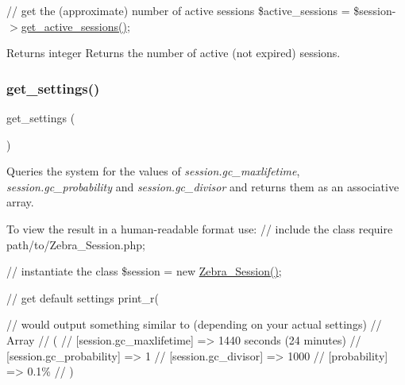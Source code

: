 {\ttfamily // get the (approximate) number of active sessions \$active\+\_\+sessions = \$session-\/$>$\mbox{\hyperlink{class_zebra___session_a7d6d31df5f4285519ff1efbc783c36a7}{get\+\_\+active\+\_\+sessions()}}; }

\begin{DoxyReturn}{Returns}
integer Returns the number of active (not expired) sessions. 
\end{DoxyReturn}
\mbox{\label{class_zebra___session_abcfd9631c087a2aa25d472ad9b450c4f}} 
\subsubsection{\texorpdfstring{get\+\_\+settings()}{get\_settings()}}
{\footnotesize\ttfamily get\+\_\+settings (\begin{DoxyParamCaption}{ }\end{DoxyParamCaption})}

Queries the system for the values of {\itshape session.\+gc\+\_\+maxlifetime}, {\itshape session.\+gc\+\_\+probability} and {\itshape session.\+gc\+\_\+divisor} and returns them as an associative array.

To view the result in a human-\/readable format use\+: {\ttfamily  // include the class require \textquotesingle{}path/to/\+Zebra\+\_\+\+Session.\+php\textquotesingle{};}

{\ttfamily // instantiate the class \$session = new \mbox{\hyperlink{class_zebra___session}{Zebra\+\_\+\+Session()}};}

{\ttfamily // get default settings print\+\_\+r(\textquotesingle{}
}

{\ttfamily 
\begin{DoxyPre}//  would output something similar to (depending on your actual settings)
//  Array
//  (
//      [session.gc\_maxlifetime] => 1440 seconds (24 minutes)
//      [session.gc\_probability] => 1
//      [session.gc\_divisor] => 1000
//      [probability] => 0.1\%
//  )
\end{DoxyPre}
}

